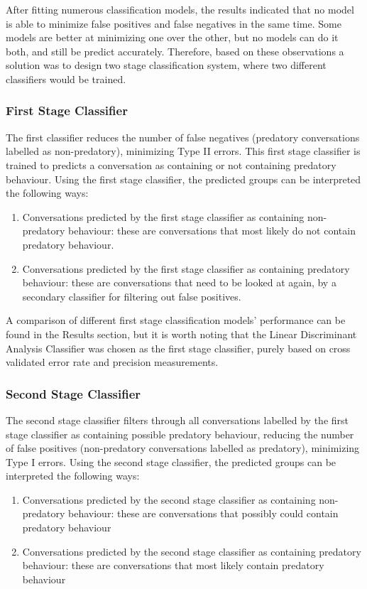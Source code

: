 \documentclass[11pt]{article}
\begin{document}
After fitting numerous classification models, the results indicated that no model is able to minimize false positives and false negatives in the same time. Some models are better at minimizing one over the other, but no models can do it both, and still be predict accurately. Therefore, based on these observations a solution was to design two stage classification system, where two different classifiers would be trained.

\subsubsection{First Stage Classifier}
The first classifier reduces the number of false negatives (predatory conversations labelled as non-predatory), minimizing Type II errors.
This first stage classifier is trained to predicts a conversation as containing or not containing predatory behaviour. Using the first stage classifier, the predicted groups can be interpreted the following ways: 
\begin{enumerate}
    \item Conversations predicted by the first stage classifier as containing non-predatory behaviour: these are conversations that most likely do not contain predatory behaviour.
    \item Conversations predicted by the first stage classifier as containing predatory behaviour: these are conversations that need to be looked at again, by a secondary classifier for filtering out false positives.
\end{enumerate}

A comparison of different first stage classification models' performance can be found in the Results section, but it is worth noting that the Linear Discriminant Analysis Classifier was chosen as the first stage classifier, purely based on cross validated error rate and precision measurements.

\subsubsection{Second Stage Classifier}
The second stage classifier filters through all conversations labelled by the first stage classifier as containing possible predatory behaviour, reducing the number of false positives (non-predatory conversations labelled as predatory), minimizing Type I errors. Using the second stage classifier, the predicted groups can be interpreted the following ways: 
\begin{enumerate}
    \item Conversations predicted by the second stage classifier as containing non-predatory behaviour: these are conversations that possibly could contain predatory behaviour
    \item Conversations predicted by the second stage classifier as containing predatory behaviour: these are conversations that most likely contain predatory behaviour
\end{enumerate}
\end{document}
